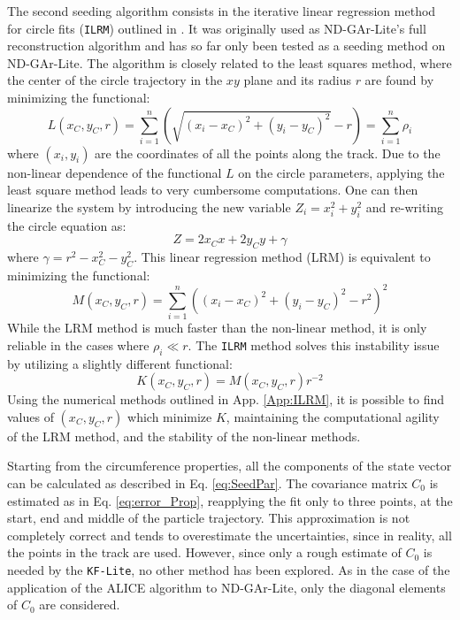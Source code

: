 The second seeding algorithm consists in the iterative linear regression method for circle fits (\texttt{ILRM}) outlined in \cite{ILRM}. It was originally used as ND-GAr-Lite's full reconstruction algorithm and has so far only been tested as a seeding method on ND-GAr-Lite. The algorithm is closely related to the least squares method, where the center of the circle trajectory in the $xy$ plane and its radius $r$ are found by minimizing the functional:
\begin{equation}
    L(x_C,y_C,r)=\sum_{i=1}^{n}(\sqrt{(x_i-x_C)^2+(y_i-y_C)^2}-r)=\sum_{i=1}^{n}\rho_i
\end{equation}
where $(x_i,y_i)$ are the coordinates of all the points along the track. Due to the non-linear dependence of the functional $L$ on the circle parameters, applying the least square method leads to very cumbersome computations. One can then linearize the system by introducing the new variable $Z_i=x_i^2+y_i^2$ and re-writing the circle equation as:
\begin{equation}
    Z = 2x_Cx+2y_Cy+\gamma
\end{equation}
where $\gamma = r^2-x_C^2-y_C^2$. This linear regression method (LRM) is equivalent to minimizing the functional:
\begin{equation}
    M(x_C,y_C,r)=\sum_{i=1}^{n}((x_i-x_C)^2+(y_i-y_C)^2-r^2)^2
\end{equation}
While the LRM method is much faster than the non-linear method, it is only reliable in the cases where $\rho_i\ll r$. The \texttt{ILRM} method solves this instability issue by utilizing a slightly different functional:
\begin{equation}
    \label{eq:ILRMfunctional}
    K(x_C,y_C,r)=M(x_C,y_C,r)r^{-2}
\end{equation}
Using the numerical methods outlined in App. \ref{App:ILRM}, it is possible to find values of $(x_C,y_C,r)$ which minimize $K$,  maintaining the computational agility of the LRM method, and the stability of the non-linear methods. 

Starting from the circumference properties, all the components of the state vector can be calculated as described in Eq. \ref{eq:SeedPar}. The covariance matrix $C_0$ is estimated as in Eq. \ref{eq:error_Prop}, reapplying the fit only to three points, at the start, end and middle of the particle trajectory. This approximation is not completely correct and tends to overestimate the uncertainties, since in reality, all the points in the track are used. However, since only a rough estimate of $C_0$ is needed by the \texttt{KF-Lite}, no other method has been explored. As in the case of the application of the ALICE algorithm to ND-GAr-Lite, only the diagonal elements of $C_0$ are considered.
